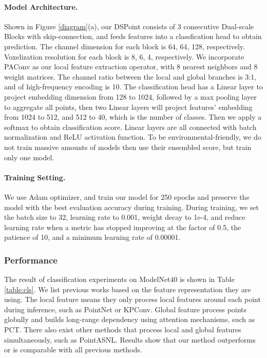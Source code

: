 \documentclass[sigconf]{acmart}
\begin{document}
\paragraph{Model Architecture.}
Shown in Figure \ref{diagram}(a), our DSPoint consists of 3 consecutive Dual-scale Blocks with skip-connection, and feeds features into a classfication head to obtain prediction. The channel dimension for each block is 64, 64, 128, respectively. Voxelization resolution for each block is 8, 6, 4, respectively. We incorporate PAConv\cite{xu2021paconv} as our local feature extraction operator, with 8 nearest neighbors and 8 weight matrices. The channel ratio between the local and global branches is 3:1, and  of high-frequency encoding is 10. The classification head has a Linear layer to project embedding dimension from 128 to 1024, followed by a max pooling layer to aggregate all points, then two Linear layers will project features' embedding from 1024 to 512, and 512 to 40, which is the number of classes. Then we apply a softmax to obtain classification score. Linear layers are all connected with batch normalization and ReLU activation function.
To be environmental-friendly, we do not train massive amounts of models then use their ensembled score, but  train only one model. 

\paragraph{Training Setting.}
We use Adam optimizer, and train our model for 250 epochs and preserve the model with the best evaluation accuracy during training. During training, we set the batch size to 32, learning rate to 0.001, weight decay to 1e-4, and reduce learning rate when a metric has stopped improving at the factor of 0.5, the patience of 10, and a minimum learning rate of 0.00001.

\subsubsection{Performance}
The result of classification experiments on ModelNet40 is shown in Table \ref{table:cls}. We list previous works based on the feature representation they are using. The local feature means they only process local features around each point during inference, such as PointNet\cite{qi2017pointnet} or KPConv\cite{thomas2019kpconv}. Global feature process points globally and builds long-range dependency using attention mechanisms, such as PCT\cite{guo2021pct}. There also exist other methods that process local and global features simultaneously, such as PointASNL\cite{yan2020pointasnl}. Results show that our method outperforms or is comparable 
with all previous methods.
\end{document}
